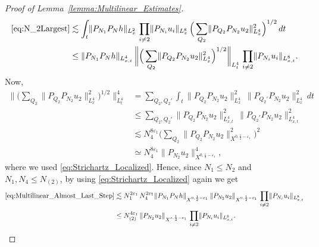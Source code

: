 \documentclass[11pt, xcolor = dvipsnames,reqno
]{amsart}
\theoremstyle{definition}
\theoremstyle{remark}
\begin{document}
\begin{proof}[Proof of Lemma~\ref{lemma:Multilinear_Estimates}]
\begin{align}
        \eqref{eq:N_2Largest} 
        & \lesssim 
        \int_t \lVert P_{N_1}P_N h \rVert_{L_x^2} \, 
        \prod_{i \neq 2} \lVert P_{N_i} u_i \rVert_{L_x^8} \, 
        \Big( \sum_{Q_2}
        \lVert P_{Q_2} P_{N_2} u_2 \rVert_{L_x^4}^2 \Big)^{1/2} \, dt \nonumber \\
        & \leq 
        \lVert P_{N_1}P_N h \rVert_{L_{x,t}^4} \, 
        \bigg\lVert \Big( \sum_{Q_2}
        \lVert P_{Q_2} P_{N_2} u_2 \rVert_{L_x^4}^2 \Big)^{1/2} \bigg\rVert_{L_t^4} \, 
        \prod_{i \neq 2} \lVert P_{N_i} u_i \rVert_{L_{x,t}^8}.
    \end{align}
    Now, 
    \begin{align}
        \bigg\lVert \Big( \sum_{Q_2}
        \lVert P_{Q_2} P_{N_2} u_2 \rVert_{L_x^4}^2 \Big)^{1/2} \bigg\rVert_{L_t^4}^4
        & = \sum_{Q_2, Q_2'} 
        \int_t 
        \lVert P_{Q_2} P_{N_2} u_2 \rVert_{L_x^4}^2 \,
        \lVert P_{Q_2'} P_{N_2} u_2 \rVert_{L_x^4}^2 \, dt \\
        & \leq \sum_{Q_2, Q_2'}
        \lVert P_{Q_2} P_{N_2} u_2 \rVert_{L_{x,t}^4}^2 \, 
        \lVert P_{Q_2'} P_{N_2} u_2 \rVert_{L_{x,t}^4}^2 \\
        & \lesssim N_4^{8\varepsilon_1} 
        \Big( \sum_{Q_2}
        \lVert P_{Q_2} P_{N_2} u_2 \rVert_{X^{0,\frac{1}{2}-\varepsilon_1}}^2 
        \Big)^2 \\
        & \simeq 
        N_4^{8\varepsilon_1}  
        \lVert P_{N_2} u_2 \rVert_{X^{0,\frac{1}{2}-\varepsilon_1}}^4, 
    \end{align}
    where we used \eqref{eq:Strichartz_Localized}. Hence, since $N_1 \leq N_2$ and $N_1, N_4 \leq N_{(2)}$, by using \eqref{eq:Strichartz_Localized} again we get
    \begin{align}
        \eqref{eq:Multilinear_Almost_Last_Step}
        & \lesssim 
        N_1^{2\varepsilon_1} \, N_4^{2\varepsilon_1} 
        \lVert P_{N_1}P_N h \rVert_{X^{0,\frac{1}{2}-\varepsilon_1}} \, 
        \lVert P_{N_2} u_2 \rVert_{X^{0,\frac{1}{2}-\varepsilon_1}}\, 
        \prod_{i \neq 2} \lVert P_{N_i} u_i \rVert_{L_{x,t}^8} \\
        & \leq 
        N_{(2)}^{4\varepsilon_1} \, 
        \lVert P_{N_2} u_2 \rVert_{X^{s,\frac{1}{2}-\varepsilon_1}}\, 
        \prod_{i \neq 2} \lVert P_{N_i} u_i \rVert_{L_{x,t}^8}.\qedhere
    \end{align}
\end{proof}
\end{document}
